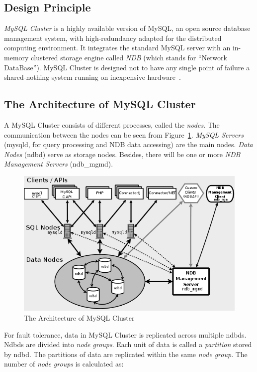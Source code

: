 \subsection{Design Principle}
\textit{MySQL Cluster} is a highly available version of MySQL, an open source database management system, with high-redundancy adapted for the distributed computing environment. It integrates the standard MySQL server with an in-memory clustered storage engine called \textit{NDB} (which stands for “Network DataBase”). MySQL Cluster is designed not to have any single point of failure a shared-nothing system running on inexpensive hardware~\cite{mysqlcluster}.

\subsection{The Architecture of MySQL Cluster}
\noindent A MySQL Cluster consists of different processes, called the \textit{nodes}. The communication between the nodes can be seen from Figure~\ref{fig:mysqlclusterarchitecture}. \textit{MySQL Servers} (mysqld, for query processing and NDB data accessing) are the main nodes. \textit{Data Nodes} (ndbd) serve as storage nodes. Besides, there will be one or more \textit{NDB Management Servers} (ndb\_mgmd).

\begin{figure}[h!]
	\centering
	\includegraphics[scale=0.5]{figs/mysqlcluster.png}
	\caption{The Architecture of MySQL Cluster \protect \cite{mysqlcluster}}
	\label{fig:mysqlclusterarchitecture}
\end{figure}

\noindent For fault tolerance, data in MySQL Cluster is replicated across multiple ndbds. Ndbds are divided into \textit{node groups}. Each unit of data is called a \textit{partition} stored by ndbd. The partitions of data are replicated within the same \textit{node group}. The number of \textit{node groups} is calculated as:


